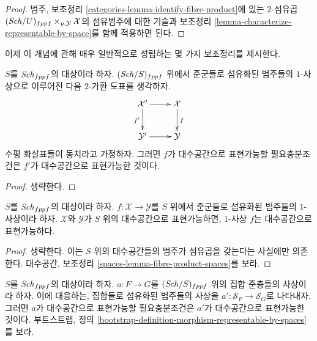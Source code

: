 \begin{proof}
범주, 보조정리 \ref{categories-lemma-identify-fibre-product}에 있는
$2$-섬유곱 $(\mathit{Sch}/U)_{fppf} \times_{y, \mathcal{Y}} \mathcal{X}$의
섬유범주에 대한 기술과 보조정리
\ref{lemma-characterize-representable-by-space}를 함께 적용하면 된다.
\end{proof}

\noindent
이제 이 개념에 관해 매우 일반적으로 성립하는 몇 가지 보조정리를 제시한다.

\begin{lemma}
\label{lemma-representable-by-spaces-morphism-equivalent}
$S$를 $\mathit{Sch}_{fppf}$의 대상이라 하자. $(\mathit{Sch}/S)_{fppf}$ 위에서
준군들로 섬유화된 범주들의 $1$-사상으로 이루어진 다음 $2$-가환 도표를
생각하자.
$$
\xymatrix{
\mathcal{X}' \ar[r] \ar[d]_{f'} & \mathcal{X} \ar[d]^f \\
\mathcal{Y}' \ar[r] & \mathcal{Y}
}
$$
수평 화살표들이 동치라고 가정하자. 그러면 $f$가 대수공간으로 표현가능할
필요충분조건은 $f'$가 대수공간으로 표현가능한 것이다.
\end{lemma}

\begin{proof}
생략한다.
\end{proof}

\begin{lemma}
\label{lemma-morphism-spaces-gives-representable-by-spaces}
$S$를 $\mathit{Sch}_{fppf}$의 대상이라 하자. $f : \mathcal{X} \to \mathcal{Y}$를
$S$ 위에서 준군들로 섬유화된 범주들의 $1$-사상이라 하자.
$\mathcal{X}$와 $\mathcal{Y}$가 $S$ 위의 대수공간으로 표현가능하면,
$1$-사상 $f$는 대수공간으로 표현가능하다.
\end{lemma}

\begin{proof}
생략한다. 이는 $S$ 위의 대수공간들의 범주가 섬유곱을 갖는다는 사실에만
의존한다. 대수공간, 보조정리 \ref{spaces-lemma-fibre-product-spaces}를
보라.
\end{proof}

\begin{lemma}
\label{lemma-map-presheaves-representable-by-algebraic-spaces}
$S$를 $\mathit{Sch}_{fppf}$의 대상이라 하자. $a : F \to G$를
$(\mathit{Sch}/S)_{fppf}$ 위의 집합 준층들의 사상이라 하자. 이에 대응하는,
집합들로 섬유화된 범주들의 사상을
$a' : \mathcal{S}_F  \to \mathcal{S}_G$로 나타내자. 그러면 $a$가
대수공간으로 표현가능할 필요충분조건은 $a'$가 대수공간으로 표현가능한
것이다. 부트스트랩, 정의
\ref{bootstrap-definition-morphism-representable-by-spaces}를 보라.
\end{lemma}

